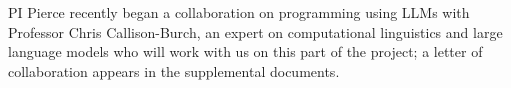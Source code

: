 PI Pierce recently began a collaboration on programming using LLMs
with Professor Chris Callison-Burch, an expert on computational
linguistics and large language models who will work with us on this
part of the project; a letter of collaboration appears in the
supplemental documents.


%
